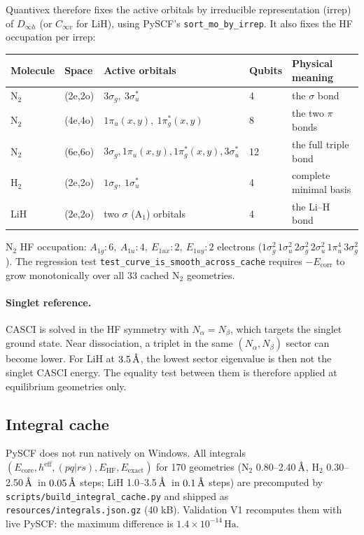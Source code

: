 \documentclass[10pt,a4paper]{article}
\newcommand{\Ha}{\,\mathrm{Ha}}
\newcommand{\Ang}{\ensuremath{\,\text{\normalfont\AA}}}
\newcommand{\code}[1]{\texttt{\small #1}}
\begin{document}
Quantivex therefore fixes the active orbitals by irreducible representation (irrep) of $D_{\infty h}$ (or $C_{\infty v}$ for LiH), using PySCF's \code{sort\_mo\_by\_irrep}. It also fixes the HF occupation per irrep:

\begin{center}\small
\begin{tabular}{@{}lllll@{}}\toprule
Molecule & Space & Active orbitals & Qubits & Physical meaning\\\midrule
N$_2$ & (2e,2o) & $3\sigma_g,\ 3\sigma_u^*$ & 4 & the $\sigma$ bond\\
N$_2$ & (4e,4o) & $1\pi_{u}(x,y),\ 1\pi_g^*(x,y)$ & 8 & the two $\pi$ bonds\\
N$_2$ & (6e,6o) & $3\sigma_g,1\pi_u(x,y),1\pi_g^*(x,y),3\sigma_u^*$ & 12 & the full triple bond\\
H$_2$ & (2e,2o) & $1\sigma_g,\ 1\sigma_u^*$ & 4 & complete minimal basis\\
LiH & (2e,2o) & two $\sigma$ (A$_1$) orbitals & 4 & the Li--H bond\\\bottomrule
\end{tabular}
\end{center}
N$_2$ HF occupation: $A_{1g}{:}6,\ A_{1u}{:}4,\ E_{1ux}{:}2,\ E_{1uy}{:}2$ electrons ($1\sigma_g^2\,1\sigma_u^2\,2\sigma_g^2\,2\sigma_u^2\,1\pi_u^4\,3\sigma_g^2$). The regression test \code{test\_curve\_is\_smooth\_across\_cache} requires $-E_{\mathrm{corr}}$ to grow monotonically over all 33 cached N$_2$ geometries.

\paragraph{Singlet reference.} CASCI is solved in the HF symmetry with $N_\alpha=N_\beta$, which targets the singlet ground state. Near dissociation, a triplet in the same $(N_\alpha,N_\beta)$ sector can become lower. For LiH at $3.5\Ang$, the lowest sector eigenvalue is then not the singlet CASCI energy. The equality test between them is therefore applied at equilibrium geometries only.

\subsection{Integral cache}
PySCF does not run natively on Windows. All integrals $(E_{\mathrm{core}},h^{\mathrm{eff}},(pq|rs),E_{\mathrm{HF}},E_{\mathrm{exact}})$ for 170 geometries (N$_2$ 0.80--2.40\Ang, H$_2$ 0.30--2.50\Ang\ in $0.05\Ang$ steps; LiH 1.0--3.5\Ang\ in $0.1\Ang$ steps) are precomputed by \code{scripts/build\_integral\_cache.py} and shipped as \code{resources/integrals.json.gz} (40 kB). Validation V1 recomputes them with live PySCF: the maximum difference is $1.4\times10^{-14}\Ha$.
\end{document}
